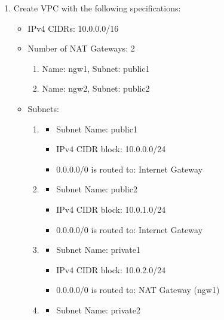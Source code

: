 \documentclass{article}
\begin{document}
\begin{enumerate}
    \item Create VPC with the following specifications:
    \begin{itemize}
        \item IPv4 CIDRs: 10.0.0.0/16
        \item Number of NAT Gateways: 2 
        \begin{enumerate}
            \item Name: ngw1, Subnet: public1
            \item Name: ngw2, Subnet: public2
        \end{enumerate}
        \item Subnets:
        \begin{enumerate}
            \item 
            \begin{itemize}
                \item Subnet Name: public1
                \item IPv4 CIDR block: 10.0.0.0/24
                \item 0.0.0.0/0 is routed to: Internet Gateway
            \end{itemize}
            \vspace{5mm} 
            \item 
            \begin{itemize}
                \item Subnet Name: public2
                \item IPv4 CIDR block: 10.0.1.0/24
                \item 0.0.0.0/0 is routed to: Internet Gateway
            \end{itemize}
            \vspace{5mm} 
            \item 
            \begin{itemize}
                \item Subnet Name: private1
                \item IPv4 CIDR block: 10.0.2.0/24
                \item 0.0.0.0/0 is routed to: NAT Gateway (ngw1) 
            \end{itemize}
            \vspace{5mm} 
            \item 
            \begin{itemize}
                \item Subnet Name: private2

\end{itemize}
\end{enumerate}
\end{itemize}
\end{enumerate}
\end{document}
